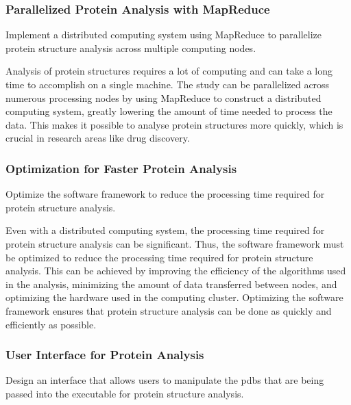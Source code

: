 \documentclass[]{final_report}
\begin{document}
\subsubsection{Parallelized Protein Analysis with MapReduce}

\begin{displayquote}
    Implement a distributed computing system using MapReduce to parallelize protein structure analysis across multiple computing nodes.
\end{displayquote}

Analysis of protein structures requires a lot of computing and can take a long time to accomplish on a single machine. The study can be parallelized across numerous processing nodes by using MapReduce to construct a distributed computing system, greatly lowering the amount of time needed to process the data. This makes it possible to analyse protein structures more quickly, which is crucial in research areas like drug discovery.

\subsubsection{Optimization for Faster Protein Analysis}

\begin{displayquote}
    Optimize the software framework to reduce the processing time required for protein structure analysis.
\end{displayquote}

Even with a distributed computing system, the processing time required for protein structure analysis can be significant. Thus, the software framework must be optimized to reduce the processing time required for protein structure analysis. This can be achieved by improving the efficiency of the algorithms used in the analysis, minimizing the amount of data transferred between nodes, and optimizing the hardware used in the computing cluster. Optimizing the software framework ensures that protein structure analysis can be done as quickly and efficiently as possible.
\clearpage

\subsubsection{User Interface for Protein Analysis}

\begin{displayquote}
    Design an interface that allows users to manipulate the pdbs that are being passed into the executable for protein structure analysis.
\end{displayquote}
\end{document}
